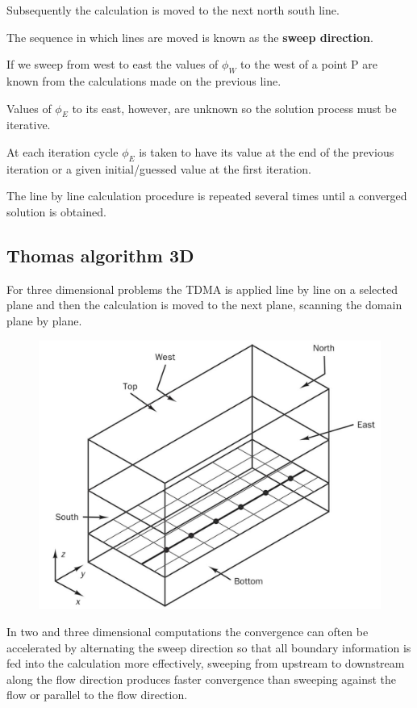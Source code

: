 \documentclass[a4paper, 15pt]{article}
\begin{document}
Subsequently
the calculation is moved to the next north south line. \newline 

The
sequence in which lines are moved is known as the \textbf{sweep direction}.

If
we sweep from west to east the values of $\phi_W$ to the west of a point P are known from the
calculations made on the previous line. 

Values
of $\phi_E$ to its east, however, are unknown so the solution process must be iterative. 

At
each iteration cycle $\phi_E$ is taken to have its value at the end of the previous iteration or a given initial/guessed value at the first iteration. \newline 

The
line by line calculation procedure is repeated several times until a converged solution is
obtained. 


\newpage
\subsection*{Thomas algorithm 3D}

For
three dimensional problems the TDMA is applied line by line on a selected plane and then
the calculation is moved to the next plane, scanning the domain plane by plane.

\begin{figure}[H]
	\centering
	\includegraphics[width=0.5\linewidth]{fig/screenshot024}
	\label{fig:screenshot024}
\end{figure}

In
two and three dimensional computations the convergence can often be accelerated by
alternating the sweep direction so that all boundary information is fed into the calculation more
effectively, sweeping from
upstream to downstream along the flow direction produces faster convergence than sweeping
against the flow or parallel to the flow direction. \newline 
\end{document}
